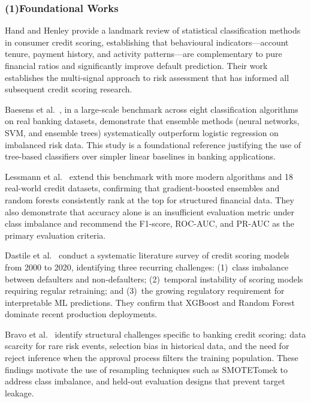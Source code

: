 \subsubsection{(1)Foundational Works}

Hand and Henley \cite{hand1997} provide a landmark review of statistical classification
methods in consumer credit scoring, establishing that behavioural indicators---account
tenure, payment history, and activity patterns---are complementary to pure financial ratios
and significantly improve default prediction. Their work establishes the multi-signal
approach to risk assessment that has informed all subsequent credit scoring research.

Baesens et al.\ \cite{baesens2003}, in a large-scale benchmark across eight classification
algorithms on real banking datasets, demonstrate that ensemble methods (neural networks,
SVM, and ensemble trees) systematically outperform logistic regression on imbalanced risk
data. This study is a foundational reference justifying the use of tree-based classifiers
over simpler linear baselines in banking applications.

Lessmann et al.\ \cite{lessmann2015} extend this benchmark with more modern algorithms and
18 real-world credit datasets, confirming that gradient-boosted ensembles and random forests
consistently rank at the top for structured financial data. They also demonstrate that
accuracy alone is an insufficient evaluation metric under class imbalance and recommend
the F1-score, ROC-AUC, and PR-AUC as the primary evaluation criteria.

Dastile et al.\ \cite{dastile2020} conduct a systematic literature survey of credit scoring
models from 2000 to 2020, identifying three recurring challenges: (1)~class imbalance
between defaulters and non-defaulters; (2)~temporal instability of scoring models requiring
regular retraining; and (3)~the growing regulatory requirement for interpretable ML
predictions. They confirm that XGBoost and Random Forest dominate recent production
deployments.

Bravo et al.\ \cite{bravo2013} identify structural challenges specific to banking credit
scoring: data scarcity for rare risk events, selection bias in historical data, and the
need for reject inference when the approval process filters the training population. These
findings motivate the use of resampling techniques such as SMOTETomek to address class
imbalance, and held-out evaluation designs that prevent target leakage.

